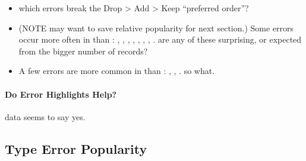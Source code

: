 \documentclass[english,submission,cleveref]{programming}
\begin{document}
\begin{itemize}
  \item
    \FILL{} which errors break the Drop > Add > Keep ``preferred order''?

  \item
    (NOTE may want to save relative popularity for next section.)
    Some errors occur more often in \mnonstrict{} than \mstrict{}:
    ,
    ,
    ,
    ,
    ,
    ,
    ,
    .
    \QALAN{} are any of these surprising, or expected from the bigger number of
    \mnonstrict{} records?

  \item
    A few errors are more common in \mstrict{} than \mnonstrict{}:
    ,
    ,
    .
    \FILL{} so what.

\end{itemize}


\paragraph{Do Error Highlights Help?}

\FILL{} data seems to say yes.


\subsection{Type Error Popularity}
\label{s:type-error-count}
\end{document}

